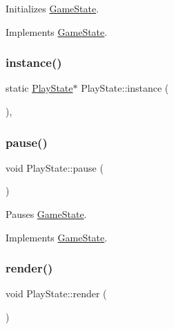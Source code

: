 Initializes \mbox{\hyperlink{class_game_state}{Game\+State}}. 



Implements \mbox{\hyperlink{class_game_state_a10b6e6bb31591c70d08ffcee5f29fa81}{Game\+State}}.

\mbox{\label{class_play_state_a6a46a82e229d66dae0c68244faa7ade3}} 
\subsubsection{\texorpdfstring{instance()}{instance()}}
{\footnotesize\ttfamily static \mbox{\hyperlink{class_play_state}{Play\+State}}$\ast$ Play\+State\+::instance (\begin{DoxyParamCaption}{ }\end{DoxyParamCaption})\hspace{0.3cm}{\ttfamily [inline]}, {\ttfamily [static]}}

\mbox{\label{class_play_state_a5c135eed71fd8dbf30b75e577c28ad0d}} 
\subsubsection{\texorpdfstring{pause()}{pause()}}
{\footnotesize\ttfamily void Play\+State\+::pause (\begin{DoxyParamCaption}{ }\end{DoxyParamCaption})\hspace{0.3cm}{\ttfamily [virtual]}}



Pauses \mbox{\hyperlink{class_game_state}{Game\+State}}. 



Implements \mbox{\hyperlink{class_game_state_aafc908582760099891b37bb380ddd87a}{Game\+State}}.

\mbox{\label{class_play_state_a186b8cb25c420e2ce54002bcb08d8bee}} 
\subsubsection{\texorpdfstring{render()}{render()}}
{\footnotesize\ttfamily void Play\+State\+::render (\begin{DoxyParamCaption}\item[{\mbox{\hyperlink{class_game_engine}{Game\+Engine}} $\ast$}]{ }\end{DoxyParamCaption})\hspace{0.3cm}{\ttfamily [virtual]}}



